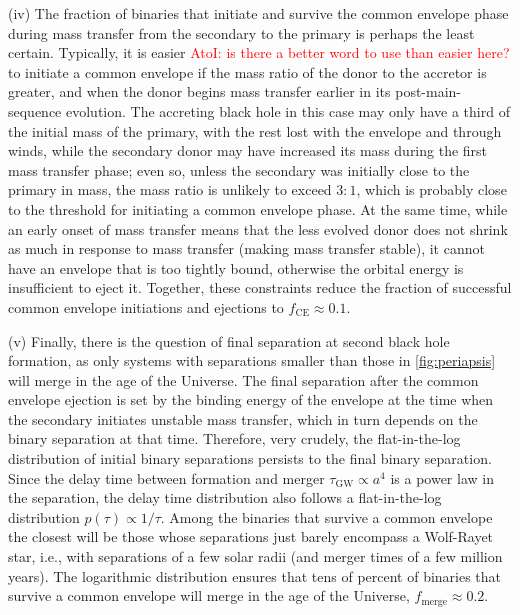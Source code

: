 \documentclass[iop,onecolumn]{revtex4}
\newcommand{\ajf}[1]{\textcolor{red}{AtoI: #1}}
\begin{document}
(iv) The fraction of binaries that initiate and survive the common envelope phase during mass transfer from the secondary to the primary is perhaps the least certain.  Typically, it is easier \ajf{is there a better word to use than easier here?} to initiate a common envelope if the mass ratio of the donor to the accretor is greater, and when the donor begins mass transfer earlier in its post-main-sequence evolution.  The accreting black hole in this case may only have a third of the initial mass of the primary, with the rest lost with the envelope and through winds, while the secondary donor may have increased its mass during the first mass transfer phase; even so, unless the secondary was initially close to the primary in mass, the mass ratio is unlikely to exceed $3:1$, which is probably close to the threshold for initiating a common envelope phase.  At the same time, while an early onset of mass transfer means that the less evolved donor does not shrink as much in response to mass transfer (making mass transfer stable), it cannot have an envelope that is too tightly bound, otherwise the orbital energy is insufficient to eject it.  Together, these constraints reduce the fraction of successful common envelope initiations and ejections to $f_\textrm{CE} \approx 0.1$.  

(v) Finally, there is the question of final separation at second black hole formation, as only systems with separations smaller than those in \autoref{fig:periapsis} will merge in the age of the Universe.  The final separation after the common envelope ejection is set by the binding energy of the envelope at the time when the secondary initiates unstable mass transfer, which in turn depends on the binary separation at that time.  Therefore, very crudely, the flat-in-the-log distribution of initial binary separations persists to the final binary separation.  Since the delay time between formation and merger $\tau_\textrm{GW} \propto a^4$ is a power law in the separation, the delay time distribution also follows a flat-in-the-log distribution $p(\tau) \propto 1/\tau$.  Among the binaries that survive a common envelope the closest will be those whose separations just barely encompass a Wolf-Rayet star, i.e., with separations of a few solar radii (and merger times of a few million years).  The logarithmic distribution ensures that tens of percent of binaries that survive a common envelope will merge in the age of the Universe, $f_\textrm{merge} \approx 0.2$.
\end{document}
